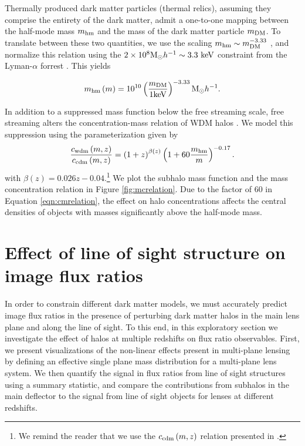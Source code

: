 Thermally produced dark matter particles (thermal relics), assuming they comprise the entirety of the dark matter, admit a one-to-one mapping between the half-mode mass $m_{\rm{hm}}$ and the mass of the dark matter particle $m_{\rm{DM}}$. To translate between these two quantities, we use the scaling $m_{\rm{hm}} \sim m_{\rm{DM}}^{-3.33}$ \citep{Schneider++12}, and normalize this relation using the $2\times 10^8 {\rm{M}_{\odot}} h^{-1} \sim 3.3 \ \rm{keV}$ constraint from the Lyman-$\alpha$ forrest \citep{Viel13}. This yields

\begin{equation}
\label{eqn:masskev}
m_{\rm{hm}}\left(m\right) = 10^{10} \left(\frac{m_{\rm{DM}}}{\rm{1keV}}\right)^{-3.33} {\rm{M}_{\odot}} h^{-1}.
\end{equation}

In addition to a suppressed mass function below the free streaming scale, free streaming alters the concentration-mass relation of WDM halos \citep{Schneider++12,Maccio++13,Bose++16,Ludlow++16}. We model this suppression using the parameterization given by \citep{Bose++16} 
\begin{equation}
\label{eqn:cmrelation}
\frac{c_{\rm{wdm}}\left(m, z\right)}{c_{\rm{cdm}}\left(m, z\right)} =  \left(1+z\right) ^{\beta\left(z\right)} \left(1+60\frac{m_{\rm{hm}}}{m}\right)^{-0.17}.
\end{equation}
with $\beta\left(z\right) = 0.026z - 0.04$.\footnote{We remind the reader that we use the $c_{\rm{cdm}}\left(m,z\right)$ relation presented in \citet{DiemerJoyce18}.} We plot the subhalo mass function and the mass concentration relation in Figure \ref{fig:mcrelation}. Due to the factor of 60 in Equation \ref{eqn:cmrelation}, the effect on halo concentrations affects the central densities of objects with masses significantly above the half-mode mass.  

\section{Effect of line of sight structure on image flux ratios}
\label{sec:multiplanelensing}
In order to constrain different dark matter models, we must accurately predict image flux ratios in the presence of perturbing dark matter halos in the main lens plane and along the line of sight. To this end, in this exploratory section we investigate the effect of halos at multiple redshifts on flux ratio observables. First, we present visualizations of the non-linear effects present in multi-plane lensing by defining an effective single plane mass distribution for a multi-plane lens system. We then quantify the signal in flux ratios from line of sight structures using a summary statistic, and compare the contributions from subhalos in the main deflector to the signal from line of sight objects for lenses at different redshifts.

